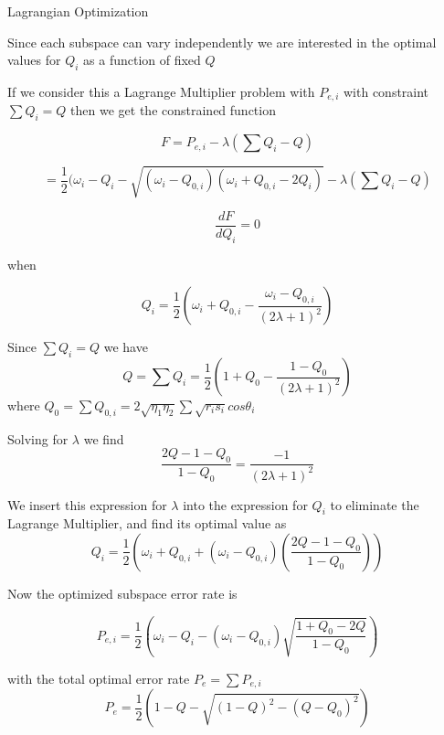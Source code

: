 \documentclass{beamer}
\begin{document}
\begin{frame}{Lagrangian Optimization}


Since each subspace can vary independently we are interested in the optimal values for $Q_i$ as a function of fixed $Q$

If we consider this a Lagrange Multiplier problem with $P_{e,i}$ with constraint $\sum Q_i = Q$ then we get the constrained function

\[F = P_{e,i} - \lambda (\sum Q_i - Q)\]

\[ =\frac{1}{2}( \omega_i-Q_i - \sqrt{(\omega_i - Q_{0,i}) (\omega_i + Q_{0,i} -2 Q_i)}  - \lambda (\sum Q_i - Q)\]
\end{frame}
\begin{frame}
\[\frac{d F}{d Q_i} =0 \]

when

\[Q_i = \frac{1}{2}( \omega_i + Q_{0,i} - \frac{\omega_i - Q_{0,i}}{(2\lambda +1)^2})\]

Since $\sum Q_i = Q$ we have
\[ Q= \sum Q_i = \frac{1}{2}( 1 + Q_0 - \frac{1 - Q_0}{(2\lambda +1)^2})\]  where $Q_0 = \sum Q_{0,i} = 2 \sqrt{\eta_1 \eta_2} \sum \sqrt{r_i s_i}cos \theta_i$
\end{frame}
\begin{frame}
Solving for $\lambda$ we find
\[\frac{2Q - 1 - Q_0}{1-Q_0} = \frac{-1}{(2\lambda+1)^2}\] 

We insert this expression for $\lambda$ into the expression for $Q_i$ to eliminate the Lagrange Multiplier, and find its optimal value as
\[Q_i = \frac{1}{2}( \omega_i + Q_{0,i} + (\omega_i - Q_{0,i})(\frac{2Q - 1 - Q_0}{1-Q_0}))\]


Now the optimized subspace error rate is

 \[P_{e,i}= \frac{1}{2}( \omega_i-Q_i - (\omega_i - Q_{0,i})\sqrt{\frac{1+ Q_0 -2 Q}{1-Q_0}})\]

with the total optimal error rate $P_e = \sum P_{e,i}$
\[P_e = \frac{1}{2}(1-Q-\sqrt{(1-Q)^2-(Q-Q_0)^2})\]
\end{frame}
\end{document}
